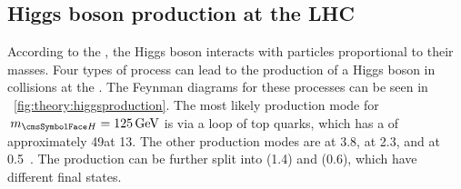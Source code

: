 \subsection{Higgs boson production at the LHC}
\label{sec:th:higgs_production_modes}

According to the \SM, the Higgs boson interacts with particles proportional to their masses. Four types of process can lead to the production of a Higgs boson in \pp collisions at the \LHC. The Feynman diagrams for these processes can be seen in \Fig~\ref{fig:theory:higgsproduction}. The most likely production mode for $\mH=125\GeV$ is \ggH via a loop of top quarks, which has a \crosssection of approximately 49\pb at 13\TeV. The other production modes are \VBF at 3.8\pb, \VH at 2.3\pb, and \ttH at 0.5\pb~\cite{LHCHXSWGYR4}. The \VH production can be further split into \WH (1.4\pb) and \ZH (0.6\pb), which have different final states.

